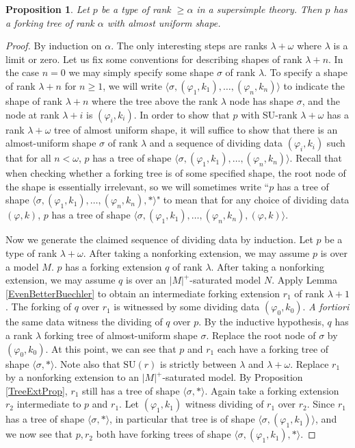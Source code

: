 \documentclass{article}
\newtheorem{prop}[theorem]{Proposition}
\theoremstyle{remark}
\theoremstyle{definition}
\begin{document}
\begin{prop}\label{AlmostUnifExistenceProp}
    Let $p$ be a type of rank $\geq\alpha$ in a supersimple theory. Then $p$ has a forking tree of rank $\alpha$ with almost uniform shape. 
\end{prop}
\begin{proof}
    By induction on $\alpha$. The only interesting steps are ranks $\lambda+\omega$ where $\lambda$ is a limit or zero. Let us fix some conventions for describing shapes of rank $\lambda+n$. In the case $n=0$ we may simply specify some shape $\sigma$ of rank $\lambda$. To specify a shape of rank $\lambda+n$ for $n\geq 1$, we will write $\langle \sigma, (\varphi_1,k_1),\dots,(\varphi_{n},k_{n})\rangle$ to indicate the shape of rank $\lambda+n$ where the tree above the rank $\lambda$ node has shape $\sigma$, and the node at rank $\lambda+i$ is $(\varphi_i,k_i)$. In order to show that $p$ with SU-rank $\lambda+\omega$ has a rank $\lambda+\omega$ tree of almost uniform shape, it will suffice to show that there is an almost-uniform shape $\sigma$ of rank $\lambda$ and a sequence of dividing data $(\varphi_i,k_i)$ such that for all $n<\omega$, $p$ has a tree of shape $\langle \sigma, (\varphi_1,k_1),\dots,(\varphi_n,k_n)\rangle$. Recall that when checking whether a forking tree is of some specified shape, the root node of the shape is essentially irrelevant, so we will sometimes write ``$p$ has a tree of shape $\langle\sigma, (\varphi_1,k_1),\dots,(\varphi_n,k_n),*\rangle$" to mean that for any choice of dividing data $(\varphi,k)$, $p$ has a tree of shape $\langle\sigma, (\varphi_1,k_1),\dots,(\varphi_n,k_n),(\varphi,k)\rangle$.

    Now we generate the claimed sequence of dividing data by induction. Let $p$ be a type of rank $\lambda+\omega$. After taking a nonforking extension, we may assume $p$ is over a model $M$. $p$ has a forking extension $q$ of rank $\lambda$. After taking a nonforking extension, we may assume $q$ is over an $|M|^+$-saturated model $N$. Apply Lemma \ref{EvenBetterBuechler} to obtain an intermediate forking extension $r_1$ of rank $\lambda+1$. The forking of $q$ over $r_1$ is witnessed by some dividing data $(\varphi_0,k_0)$. \textit{A fortiori} the same data witness the dividing of $q$ over $p$. By the inductive hypothesis, $q$ has a rank $\lambda$ forking tree of almost-uniform shape $\sigma$. Replace the root node of $\sigma$ by $(\varphi_0,k_0)$. At this point, we can see that $p$ and $r_1$ each have a forking tree of shape $\langle \sigma, *\rangle$. Note also that $\mathrm{SU}(r)$ is strictly between $\lambda$ and $\lambda+\omega$. Replace $r_1$ by a nonforking extension to an $|M|^+$-saturated model. By Proposition \ref{TreeExtProp}, $r_1$ still has a tree of shape $\langle \sigma, *\rangle$. Again take a forking extension $r_2$ intermediate to $p$ and $r_1$. Let $(\varphi_1,k_1)$ witness dividing of $r_1$ over $r_2$. Since $r_1$ has a tree of shape $\langle \sigma,*\rangle$, in particular that tree is of shape $\langle \sigma, (\varphi_1,k_1)\rangle$, and we now see that $p,r_2$ both have forking trees of shape $\langle \sigma, (\varphi_1,k_1),*\rangle$.


\end{proof}
\end{document}
